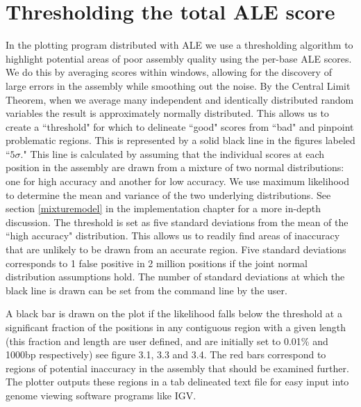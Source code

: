 \documentclass[phd,tocprelim]{cornell}
\begin{document}


\section{Thresholding the total ALE score} %
\label{sec:Thresholding the total ALE score}

In the plotting program distributed with ALE we use a thresholding algorithm to highlight potential areas of poor assembly quality using the per-base ALE scores. We do this by averaging scores within windows, allowing for the discovery of large errors in the assembly while smoothing out the noise. By the Central Limit Theorem, when we average many independent and identically distributed random variables the result is approximately normally distributed. This allows us to create a ``threshold" for which to delineate ``good" scores from ``bad" and pinpoint problematic regions. This is represented by a solid black line in the figures labeled ``$5\sigma$." This line is calculated by assuming that the individual scores at each position in the assembly are drawn from a mixture of two normal distributions: one for high accuracy and another for low accuracy. We use maximum likelihood to determine the mean and variance of the two underlying distributions. See section \ref{mixturemodel} in the implementation chapter for a more in-depth discussion. The threshold is set as five standard deviations from the mean of the ``high accuracy" distribution. This allows us to readily find areas of inaccuracy that are unlikely to be drawn from an accurate region. Five standard deviations corresponds to 1 false positive in 2 million positions if the joint normal distribution assumptions hold.  The number of standard deviations at which the black line is drawn can be set from the command line by the user.

A black bar is drawn on the plot if the likelihood falls below the threshold at a significant fraction of the positions in any contiguous region with a given length (this fraction and length are user defined, and are initially set to 0.01\% and 1000bp respectively) see figure 3.1, 3.3 and 3.4. The red bars correspond to regions of potential inaccuracy in the assembly that should be examined further. The plotter outputs these regions in a tab delineated text file for easy input into genome viewing software programs like IGV.

\end{document}
